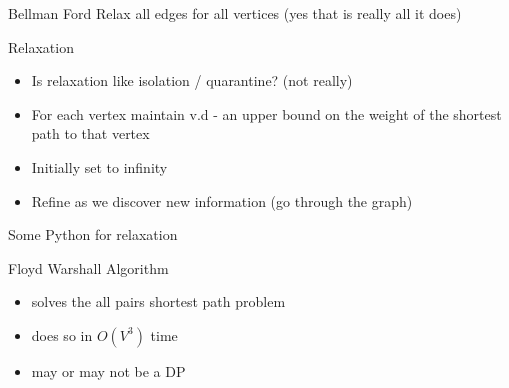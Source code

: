 \documentclass{beamer}
\begin{document}
 \begin{frame}{Bellman Ford}
     Relax all edges for all vertices
     (yes that is really all it does)
 \end{frame}
 \begin{frame}{Relaxation}
 \begin{itemize}
     \item Is relaxation like isolation / quarantine? (not really)
     \item For each vertex maintain v.d - an upper bound on the weight of the shortest path to that vertex
     \item Initially set to infinity 
     \item Refine as we discover new information (go through the graph)
 \end{itemize}
 \end{frame}
 
 \begin{frame}{Some Python for relaxation}
 
 \end{frame}
 
 
\begin{frame}{Floyd Warshall Algorithm}
    \begin{itemize}
        \item solves the all pairs shortest path problem
        \item does so in $O(V^3)$ time
        \item may or may not be a DP
    \end{itemize}
\end{frame}
\end{document}
